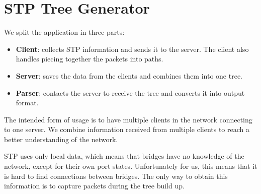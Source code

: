 \chapter{STP Tree Generator}
\label{stp_gen}
We split the application in three parts:
\begin{itemize}
    \item \textbf{Client}: collects STP information and sends it to the server.
        The client also handles piecing together the packets into paths.
    \item \textbf{Server}: saves the data from the clients and combines them into one tree.
    \item \textbf{Parser}: contacts the server to receive the tree and converts it into output format.
\end{itemize}
The intended form of usage is to have multiple clients in the network connecting to one server.
We combine information received from multiple clients to reach a better understanding of the network.

STP uses only local data, which means that bridges have no knowledge of the network, except for their own port states.
Unfortunately for us, this means that it is hard to find connections between bridges.
The only way to obtain this information is to capture packets during the tree build up.

